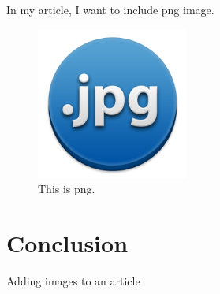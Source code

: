 \documentclass{proc}
\begin{document}
	In my article, I want to include png image.
	\begin{figure}[htbp]
		\begin{center}
			\includegraphics[width=5cm]{jpg.png}
		\end{center}
		\caption{This is png.}
		\label{fig:png}
	\end{figure}
	
	\section{Conclusion}
	Adding images to an article
	
\end{document}
